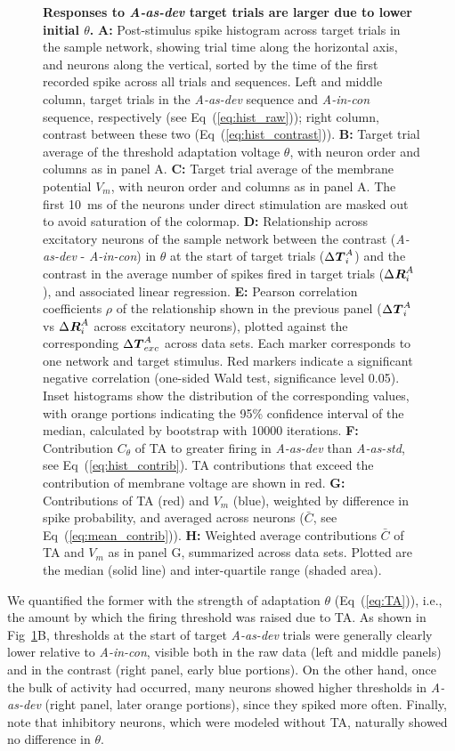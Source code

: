 \documentclass[10pt,letterpaper]{article}
\newcommand{\dev}{\textit{A-as-dev}}
\newcommand{\msc}{\textit{A-in-con}}
\newcommand{\std}{\textit{A-as-std}}
\newcommand{\ifstringequal}[4]{%
  \ifnum\pdfstrcmp{#1}{#2}=0
  #3%
  \else
  #4%
  \fi
}
\newcommand{\seqreplace}[1]{\ifstringequal{dev}{#1}{\dev}{%
    \ifstringequal{std}{#1}{\std}{%
        \ifstringequal{msc}{#1}{\msc}{#1}%
    }%
}}
\newcommand{\R}[3][]{{}^{\seqreplace{#1}}_{}\boldsymbol R^{#2}_{#3}}
\newcommand{\T}[3][]{{}^{\seqreplace{#1}}_{}\boldsymbol T^{#2}_{#3}}
\newcommand{\FIG}[1]{Fig~\ref{fig:#1}}
\newcommand{\EQ}[1]{Eq~(\ref{eq:#1})}
\begin{document}
\begin{figure}[!htbp]
    \caption{%
        \textbf{Responses to \dev{} target trials are larger due to lower initial $\theta$.}
        \textbf{A:} Post-stimulus spike histogram across target trials in the sample network, showing trial time along the horizontal axis, and neurons along the vertical, sorted by the time of the first recorded spike across all trials and sequences. Left and middle column, target trials in the \dev{} sequence and \msc{} sequence, respectively (see \EQ{hist_raw}); right column, contrast between these two (\EQ{hist_contrast}).
        \textbf{B:} Target trial average of the threshold adaptation voltage $\theta$, with neuron order and columns as in panel A.
        \textbf{C:} Target trial average of the membrane potential $V_m$, with neuron order and columns as in panel A. The first \qty{10}{\milli\second} of the neurons under direct stimulation are masked out to avoid saturation of the colormap.
        \textbf{D:} Relationship across excitatory neurons of the sample network between the contrast (\dev{} - \msc{}) in $\theta$ at the start of target trials ($\Delta \T{A}{i}$) and the contrast in the average number of spikes fired in target trials ($\Delta \R{A}{i}$), and associated linear regression.
        \textbf{E:} Pearson correlation coefficients $\rho$ of the relationship shown in the previous panel ($\Delta \T{A}{i}$ vs $\Delta \R{A}{i}$ across excitatory neurons), plotted against the corresponding $\Delta \T{A}{exc}$ across data sets. Each marker corresponds to one network and target stimulus. Red markers indicate a significant negative correlation (one-sided Wald test, significance level 0.05). Inset histograms show the distribution of the corresponding values, with orange portions indicating the 95\% confidence interval of the median, calculated by bootstrap with 10000 iterations.
        \textbf{F:} Contribution $C_\theta$ of TA to greater firing in \dev{} than \std{}, see \EQ{hist_contrib}. TA contributions that exceed the contribution of membrane voltage are shown in red.
        \textbf{G:} Contributions of TA (red) and $V_m$ (blue), weighted by difference in spike probability, and averaged across neurons ($\bar C$, see \EQ{mean_contrib}).
        \textbf{H:} Weighted average contributions $\bar C$ of TA and $V_m$ as in panel G, summarized across data sets. Plotted are the median (solid line) and inter-quartile range (shaded area).
    }
    \label{fig:4}
\end{figure}

We quantified the former with the strength of adaptation $\theta$ (\EQ{TA}), i.e., the amount by which the firing threshold was raised due to TA. As shown in \FIG{4}B, thresholds at the start of target \dev{} trials were generally clearly lower relative to \msc{}, visible both in the raw data (left and middle panels) and in the contrast (right panel, early blue portions). On the other hand, once the bulk of activity had occurred, many neurons showed higher thresholds in \dev{} (right panel, later orange portions), since they spiked more often. Finally, note that inhibitory neurons, which were modeled without TA, naturally showed no difference in $\theta$.
\end{document}
